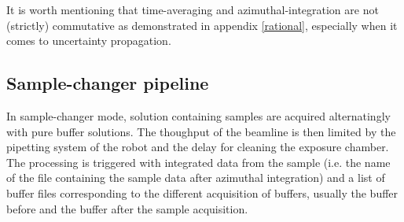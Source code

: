 \documentclass[preprint]{iucr}              %
\begin{document}


It is worth mentioning that time-averaging and azimuthal-integration are not (strictly) commutative as demonstrated in appendix \ref{rational}, especially when it comes to uncertainty propagation.


\subsection{Sample-changer pipeline}
\label{sc-pipeline}
In sample-changer mode, solution containing samples are acquired alternatingly with pure buffer solutions.
The thoughput of the beamline is then limited by the pipetting system of the robot and the delay for cleaning the exposure chamber.  
The processing is triggered with integrated data from the sample (i.e. the name of the file containing the sample data after azimuthal integration) and a list of 
buffer files corresponding to the different acquisition of buffers, usually the buffer before and the buffer after the sample acquisition.
\end{document}
